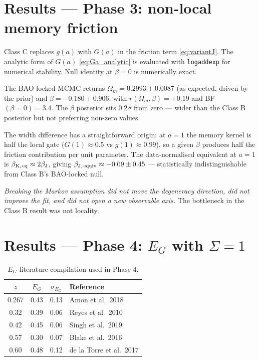 \documentclass[11pt,a4paper]{article}
\begin{document}
\section{Results --- Phase 3: non-local memory friction}
\label{sec:results_C}

Class C replaces $g(a)$ with $G(a)$ in the friction term \eqref{eq:variantJ}. The analytic form of $G(a)$ \eqref{eq:Ga_analytic} is evaluated with \texttt{logaddexp} for numerical stability. Null identity at $\beta = 0$ is numerically exact.

The BAO-locked MCMC returns $\Omega_m = 0.2993 \pm 0.0087$ (as expected, driven by the prior) and $\beta = -0.180 \pm 0.906$, with $r(\Omega_m, \beta) = +0.19$ and BF$(\beta=0) = 3.4$. The $\beta$ posterior sits 0.2$\sigma$ from zero --- wider than the Class B posterior but not preferring non-zero values.

The width difference has a straightforward origin: at $a = 1$ the memory kernel is half the local gate ($G(1) \approx 0.5$ vs $g(1) \approx 0.99$), so a given $\beta$ produces half the friction contribution per unit parameter. The data-normalised equivalent at $a=1$ is $\beta_{\rm K,\,eq} \approx 2\beta_{\rm J}$, giving $\beta_{\rm J,\,equiv} \approx -0.09 \pm 0.45$ --- statistically indistinguishable from Class B's BAO-locked null.

\emph{Breaking the Markov assumption did not move the degeneracy direction, did not improve the fit, and did not open a new observable axis.} The bottleneck in the Class B result was not locality.

\section{Results --- Phase 4: $E_G$ with $\Sigma = 1$}
\label{sec:results_D}

\begin{table}[!ht]
\centering\small
\caption{$E_G$ literature compilation used in Phase 4.}
\label{tab:eg_data}
\begin{tabular}{@{}cccl@{}}
\toprule
$z$ & $E_G$ & $\sigma_{E_G}$ & Reference \\
\midrule
0.267 & 0.43 & 0.13 & Amon et al.\ 2018 \cite{Amon2018} \\
0.32  & 0.39 & 0.06 & Reyes et al.\ 2010 \cite{Reyes2010} \\
0.42  & 0.45 & 0.06 & Singh et al.\ 2019 \cite{Singh2019} \\
0.57  & 0.30 & 0.07 & Blake et al.\ 2016 \cite{Blake2016} \\
0.60  & 0.48 & 0.12 & de la Torre et al.\ 2017 \cite{delaTorre2017} \\
\bottomrule
\end{tabular}
\end{table}
\end{document}
